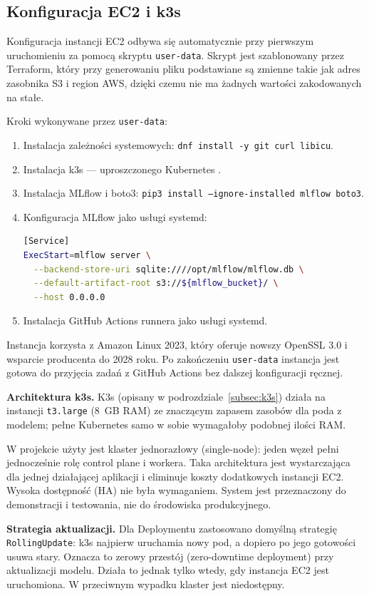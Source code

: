 \subsection{Konfiguracja EC2 i k3s}

Konfiguracja instancji EC2 odbywa się automatycznie przy pierwszym uruchomieniu za pomocą skryptu \texttt{user-data}. Skrypt jest szablonowany przez Terraform, który przy generowaniu pliku podstawiane są zmienne takie jak adres zasobnika S3 i region AWS, dzięki czemu nie ma żadnych wartości zakodowanych na stałe.

Kroki wykonywane przez \texttt{user-data}:
\begin{enumerate}
  \item Instalacja zależności systemowych: \texttt{dnf install -y git curl libicu}.
  \item Instalacja k3s --- uproszczonego Kubernetes \cite{k3s_docs}.
  \item Instalacja MLflow i boto3: \texttt{pip3 install --ignore-installed mlflow boto3}.
  \item Konfiguracja MLflow jako usługi systemd:
\begin{lstlisting}[language=bash]
[Service]
ExecStart=mlflow server \
  --backend-store-uri sqlite:////opt/mlflow/mlflow.db \
  --default-artifact-root s3://${mlflow_bucket}/ \
  --host 0.0.0.0
\end{lstlisting}
  \item Instalacja GitHub Actions runnera jako usługi systemd.
\end{enumerate}

Instancja korzysta z Amazon Linux 2023, który oferuje nowszy OpenSSL 3.0 i wsparcie producenta do 2028 roku. Po zakończeniu \texttt{user-data} instancja jest gotowa do przyjęcia zadań z GitHub Actions bez dalszej konfiguracji ręcznej.

\textbf{Architektura k3s.} K3s (opisany w podrozdziale~\ref{subsec:k3s}) działa na instancji \texttt{t3.large} (8~GB RAM) ze znaczącym zapasem zasobów dla poda z modelem; pełne Kubernetes samo w sobie wymagałoby podobnej ilości RAM.

W projekcie użyty jest klaster jednorazłowy (single-node): jeden węzeł pełni jednocześnie rolę control plane i workera. Taka architektura jest wystarczająca dla jednej działającej aplikacji i eliminuje koszty dodatkowych instancji EC2. Wysoka dostępność (HA) nie była wymaganiem. System jest przeznaczony do demonstracji i testowania, nie do środowiska produkcyjnego.

\textbf{Strategia aktualizacji.} Dla Deploymentu zastosowano domyślną strategię \texttt{RollingUpdate}: k3s najpierw uruchamia nowy pod, a dopiero po jego gotowości usuwa stary. Oznacza to zerowy przestój (zero-downtime deployment) przy aktualizacji modelu. Działa to jednak tylko wtedy, gdy instancja EC2 jest uruchomiona. W przeciwnym wypadku klaster jest niedostępny.


